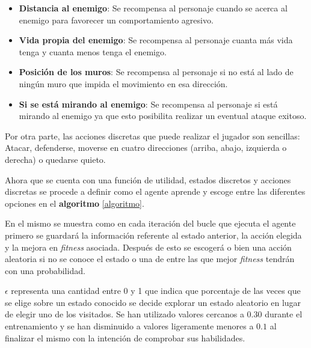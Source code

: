 \begin{itemize}
	\item \textbf{Distancia al enemigo}: Se recompensa al personaje cuando se acerca al enemigo para favorecer un comportamiento agresivo.
	\item \textbf{Vida propia del enemigo}: Se recompensa al personaje cuanta más vida tenga y cuanta menos tenga el enemigo.
	\item \textbf{Posición de los muros}: Se recompensa al personaje si no está al lado de ningún muro que impida el movimiento en esa dirección.
	\item \textbf{Si se está mirando al enemigo}: Se recompensa al personaje si está mirando al enemigo ya que esto posibilita realizar un eventual ataque exitoso.
\end{itemize}

\bigskip

Por otra parte, las acciones discretas que puede realizar el jugador son sencillas: Atacar, defenderse, moverse en cuatro direcciones (arriba, abajo, izquierda o derecha) o quedarse quieto.

\bigskip

Ahora que se cuenta con una función de utilidad, estados discretos y acciones discretas se procede a definir como el agente aprende y escoge entre las diferentes opciones en el \textbf{algoritmo} \ref{algoritmo}.

\bigskip


En el mismo se muestra como en cada iteración del bucle que ejecuta el agente primero se guardará la información referente al estado anterior, la acción elegida y la mejora en \textit{fitness} asociada. Después de esto se escogerá o bien una acción aleatoria si no se conoce el estado o una de entre las que mejor \textit{fitness} tendrán con una probabilidad.

\bigskip


\textbf{$\epsilon$} representa una cantidad entre 0 y 1 que indica que porcentaje de las veces que se elige sobre un estado conocido se decide explorar un estado aleatorio en lugar de  elegir uno de los visitados. Se han utilizado valores cercanos a $0.30$ durante el entrenamiento y se han disminuido a valores ligeramente menores a $0.1$ al finalizar el mismo con la intención de comprobar sus habilidades.


